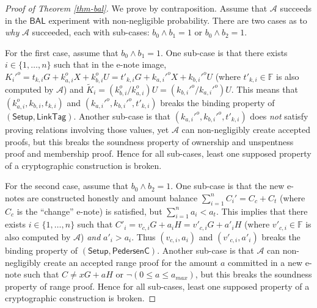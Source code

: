 \documentclass{article}
\begin{document}
\begin{proof}[Proof of Theorem \ref{thm-bal}]
We prove by contraposition. Assume that $\mathcal{A}$ succeeds in the $\textsf{BAL}$ experiment with non-negligible probability. There are two cases as to \textit{why} $\mathcal{A}$ succeeded, each with sub-cases: $b_0 \wedge b_1 = 1$ or $b_0 \wedge b_2 = 1$.

For the first case, assume that $b_0 \wedge b_1 = 1$. One sub-case is that there exists $i\in\{1,\ldots,n\}$ such that in the e-note image, $K_i'^o = t_{k,i} G + k_{a,i}^o X + k_{b,i}^o U = t'_{k,i} G + k_{a,i}'^o X + k_{b,i}'^o U$ (where $t'_{k,i}\in\mathbb{F}$ is also computed by $\mathcal{A}$) and $\tilde{K}_i = (k_{b,i}^o/k_{a,i}^o)U = (k_{b,i}'^o/k_{a,i}'^o)U$. This means that $(k_{a,i}^o, k_{b,i}, t_{k,i})$ and $( k_{a,i}'^o, k_{b,i}'^o, t'_{k,i})$ breaks the binding property of $(\textsf{Setup}, \textsf{LinkTag})$. Another sub-case is that $( k_{a,i}'^o, k_{b,i}'^o, t'_{k,i})$ does \textit{not} satisfy proving relations involving those values, yet $\mathcal{A}$ can non-negligibly create accepted proofs, but this breaks the soundness property of ownership and unspentness proof and membership proof. Hence for all sub-cases, least one supposed property of a cryptographic construction is broken.

For the second case, assume that $b_0 \wedge b_2 = 1$. One sub-case is that the new e-notes are constructed honestly and amount balance $\sum_{i=1}^n{C_i'}=C_c + C_t$ (where $C_c$ is the ``change'' e-note) is satisfied, but $\sum_{i=1}^n{a_i} < a_t$. This implies that there exists $i\in\{1,\ldots,n\}$ such that $C'_i = v_{c,i} G + a_i H = v'_{c,i} G + a'_i H$ (where $v'_{c,i}\in\mathbb{F}$ is also computed by $\mathcal{A}$) \textit{and} $a'_i > a_i$. Thus $( v_{c,i}, a_i)$ and $(v'_{c,i}, a'_i)$ breaks the binding property of $(\textsf{Setup}, \textsf{PedersenC})$. Another sub-case is that $\mathcal{A}$ can non-negligibly create an accepted range proof for the amount $a$ committed in a new e-note such that $C \ne x G + a H$ or $\neg (0 \le a \le a_{max})$, but this breaks the soundness property of range proof. Hence for all sub-cases, least one supposed property of a cryptographic construction is broken.
\end{proof}
\end{document}
